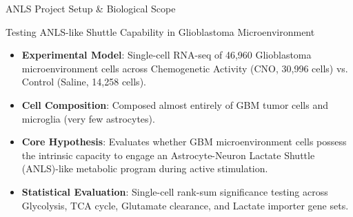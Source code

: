 \documentclass[10pt, aspectratio=169]{beamer}
\begin{document}
\begin{frame}{ANLS Project Setup \& Biological Scope}
  \begin{block}{Testing ANLS-like Shuttle Capability in Glioblastoma Microenvironment}
    \begin{itemize}
      \item \textbf{Experimental Model}: Single-cell RNA-seq of 46,960 Glioblastoma microenvironment cells across Chemogenetic Activity (CNO, 30,996 cells) vs. Control (Saline, 14,258 cells).
      \item \textbf{Cell Composition}: Composed almost entirely of GBM tumor cells and microglia (very few astrocytes).
      \item \textbf{Core Hypothesis}: Evaluates whether GBM microenvironment cells possess the intrinsic capacity to engage an Astrocyte-Neuron Lactate Shuttle (ANLS)-like metabolic program during active stimulation.
      \item \textbf{Statistical Evaluation}: Single-cell rank-sum significance testing across Glycolysis, TCA cycle, Glutamate clearance, and Lactate importer gene sets.
    \end{itemize}
  \end{block}
\end{frame}
\end{document}
